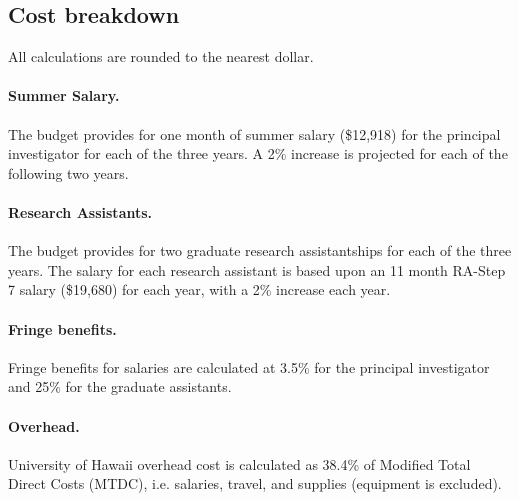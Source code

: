 \subsection*{Cost breakdown}
\label{cost-breakdown}

All calculations are rounded to the nearest dollar.

\paragraph{Summer Salary.}  
The budget provides for one month of summer salary (\$12,918) for the principal investigator for
each of the three years.  A 2\% increase is projected for each of the following two years. 

\paragraph*{Research Assistants.}  
The budget provides for two graduate research assistantships
for each of the three years.  The salary for each research assistant is
based upon an 11 month RA-Step 7 salary (\$19,680) for each year, with a 
2\% increase each year. 

\paragraph*{Fringe benefits.} 
Fringe benefits for salaries are calculated at 3.5\% for the principal
investigator and 25\% for the graduate assistants.

\paragraph*{Overhead.}  
University of Hawaii overhead cost is calculated as 38.4\% of Modified Total
Direct Costs (MTDC), i.e. salaries, travel, and supplies (equipment is
excluded).





